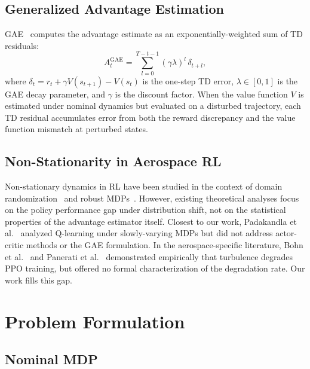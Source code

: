 \documentclass[10pt, conference]{IEEEtran}
\begin{document}
\subsection{Generalized Advantage Estimation}

GAE~\cite{schulman2016gae} computes the advantage estimate as an
exponentially-weighted sum of TD residuals:
\begin{equation}
  A_t^{\text{GAE}} = \sum_{l=0}^{T-t-1}(\gamma\lambda)^l\,\delta_{t+l},
\end{equation}
where $\delta_t = r_t + \gamma V(s_{t+1}) - V(s_t)$ is the one-step TD
error, $\lambda \in [0,1]$ is the GAE decay parameter, and $\gamma$ is
the discount factor. When the value function $V$ is estimated under
nominal dynamics but evaluated on a disturbed trajectory, each TD residual
accumulates error from both the reward discrepancy and the value function
mismatch at perturbed states.

\subsection{Non-Stationarity in Aerospace RL}

Non-stationary dynamics in RL have been studied in the context of domain
randomization~\cite{tobin2017} and robust MDPs~\cite{nilim2005}.
However, existing theoretical analyses focus on the policy performance gap
under distribution shift, not on the statistical properties of the
advantage estimator itself. Closest to our work, Padakandla et
al.~\cite{padakandla2020} analyzed Q-learning under slowly-varying MDPs
but did not address actor-critic methods or the GAE formulation. In the
aerospace-specific literature, Bohn et al.~\cite{bohn2019} and Panerati et
al.~\cite{panerati2021} demonstrated empirically that turbulence degrades
PPO training, but offered no formal characterization of the degradation
rate. Our work fills this gap.

\section{Problem Formulation}

\subsection{Nominal MDP}
\end{document}
